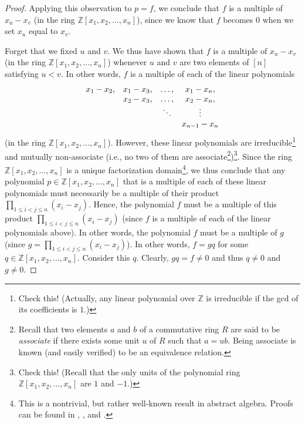 \begin{proof}
Applying this observation to $p=f$, we conclude that $f$ is a multiple of
$x_{u}-x_{v}$ (in the ring $\mathbb{Z}\left[  x_{1},x_{2},\ldots,x_{n}\right]
$), since we know that $f$ becomes $0$ when we set $x_{u}$ equal to $x_{v}$.

Forget that we fixed $u$ and $v$. We thus have shown that $f$ is a multiple of
$x_{u}-x_{v}$ (in the ring $\mathbb{Z}\left[  x_{1},x_{2},\ldots,x_{n}\right]
$) whenever $u$ and $v$ are two elements of $\left[  n\right]  $ satisfying
$u<v$. In other words, $f$ is a multiple of each of the linear polynomials%
\[%
\begin{array}
[c]{cccc}%
x_{1}-x_{2}, & x_{1}-x_{3}, & \ldots, & x_{1}-x_{n},\\
& x_{2}-x_{3}, & \ldots, & x_{2}-x_{n},\\
&  & \ddots & \vdots\\
&  &  & x_{n-1}-x_{n}%
\end{array}
\]
(in the ring $\mathbb{Z}\left[  x_{1},x_{2},\ldots,x_{n}\right]  $). However,
these linear polynomials are irreducible\footnote{Check this! (Actually, any
linear polynomial over $\mathbb{Z}$ is irreducible if the gcd of its
coefficients is $1$.)} and mutually non-associate (i.e., no two of them are
associate\footnote{Recall that two elements $a$ and $b$ of a commutative ring
$R$ are said to be \emph{associate} if there exists some unit $u$ of $R$ such
that $a=ub$. Being associate is known (and easily verified) to be an
equivalence relation.})\footnote{Check this! (Recall that the only units of
the polynomial ring $\mathbb{Z}\left[  x_{1},x_{2},\ldots,x_{n}\right]  $ are
$1$ and $-1$.)}. Since the ring $\mathbb{Z}\left[  x_{1},x_{2},\ldots
,x_{n}\right]  $ is a unique factorization domain\footnote{This is a
nontrivial, but rather well-known result in abstract algebra. Proofs can be
found in \cite[Theorem 3.7.4]{Ford21}, \cite[Remark after Corollary
8.21]{Knapp16}, \cite[Chapter IV, Theorems 4.8 and 4.9]{MiRiRu87} and
\cite[Essay 1.4, Corollary of Theorem 1 and Corollary 1 of Theorem
2]{Edward22}.}, we thus conclude that any polynomial $p\in\mathbb{Z}\left[
x_{1},x_{2},\ldots,x_{n}\right]  $ that is a multiple of each of these linear
polynomials must necessarily be a multiple of their product $\prod_{1\leq
i<j\leq n}\left(  x_{i}-x_{j}\right)  $. Hence, the polynomial $f$ must be a
multiple of this product $\prod_{1\leq i<j\leq n}\left(  x_{i}-x_{j}\right)  $
(since $f$ is a multiple of each of the linear polynomials above). In other
words, the polynomial $f$ must be a multiple of $g$ (since $g=\prod_{1\leq
i<j\leq n}\left(  x_{i}-x_{j}\right)  $). In other words, $f=gq$ for some
$q\in\mathbb{Z}\left[  x_{1},x_{2},\ldots,x_{n}\right]  $. Consider this $q$.
Clearly, $gq=f\neq0$ and thus $q\neq0$ and $g\neq0$.


\end{proof}
